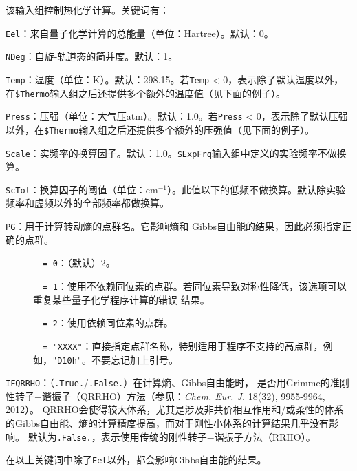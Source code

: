 \documentclass[12pt,a4paper,openany,twoside,cap,UTF8]{ctexbook}
\begin{document}
该输入组控制热化学计算。关键词有：

\bigskip{}\noindent
\verb|Eel|：来自量子化学计算的总能量（单位：Hartree）。默认：0。

\bigskip{}\noindent
\verb|NDeg|：自旋-轨道态的简并度。默认：1。

\bigskip{}\noindent
\verb|Temp|：温度（单位：K）。默认：298.15。若\verb|Temp| < 0，表示除了默认温度以外，在\texttt{\$Thermo}输入组之后还提供多个额外的温度值（见下面的例子）。

\bigskip{}\noindent
\verb|Press|：压强（单位：大气压atm）。默认：1.0。若\verb|Press| < 0，表示除了默认压强以外，在\texttt{\$Thermo}输入组之后还提供多个额外的压强值（见下面的例子）。

\bigskip{}\noindent
\verb|Scale|：实频率的换算因子。默认：1.0。\texttt{\$ExpFrq}输入组中定义的实验频率不做换算。

\bigskip{}\noindent
\verb|ScTol|：换算因子的阈值（单位：cm$^{-1}$）。此值以下的低频不做换算。默认除实验频率和虚频以外的全部频率都做换算。

\bigskip{}\noindent
\verb|PG|：用于计算转动熵的点群名。它影响熵和 Gibbs自由能的结果，因此必须指定正确的点群。
\begin{description}
\item[ ]\verb|  = 0|：（默认）2。
\item[ ]\verb|  = 1|：使用不依赖同位素的点群。若同位素导致对称性降低，该选项可以重复某些量子化学程序计算的错误 结果。
\item[ ]\verb|  = 2|：使用依赖同位素的点群。
\item[ ]\verb|  = "XXXX"|：直接指定点群名称，特别适用于程序不支持的高点群，例如，\verb|"D10h"|。不要忘记加上引号。
\end{description}

\bigskip{}\noindent
\verb|IFQRRHO|：（\verb|.True.|/\verb|.False.|）在计算熵、Gibbs自由能时，
是否用Grimme的准刚性转子$-$谐振子（QRRHO）方法（参见：\textit{Chem. Eur. J.} 18(32), 9955-9964, 2012）。
QRRHO会使得较大体系，尤其是涉及非共价相互作用和/或柔性的体系的Gibbs自由能、熵的计算精度提高，而对于刚性小体系的计算结果几乎没有影响。
默认为\verb|.False.|，表示使用传统的刚性转子$-$谐振子方法（RRHO）。

\bigskip{}
在以上关键词中除了\verb|Eel|以外，都会影响Gibbs自由能的结果。
\end{document}
